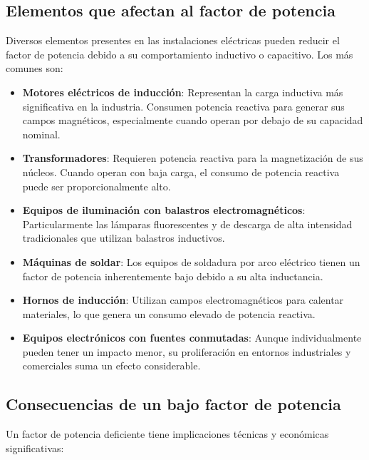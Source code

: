 \documentclass{report}          %
\begin{document}
            \subsection{Elementos que afectan al factor de potencia}
                Diversos elementos presentes en las instalaciones eléctricas pueden reducir el factor de potencia debido a su comportamiento inductivo o capacitivo. Los más comunes son:
    
                \begin{itemize}
                    \item \textbf{Motores eléctricos de inducción}: Representan la carga inductiva más significativa en la industria. Consumen potencia reactiva para generar sus campos magnéticos, especialmente cuando operan por debajo de su capacidad nominal.
                    
                    \item \textbf{Transformadores}: Requieren potencia reactiva para la magnetización de sus núcleos. Cuando operan con baja carga, el consumo de potencia reactiva puede ser proporcionalmente alto.
                    
                    \item \textbf{Equipos de iluminación con balastros electromagnéticos}: Particularmente las lámparas fluorescentes y de descarga de alta intensidad tradicionales que utilizan balastros inductivos.
                    
                    \item \textbf{Máquinas de soldar}: Los equipos de soldadura por arco eléctrico tienen un factor de potencia inherentemente bajo debido a su alta inductancia.
                    
                    \item \textbf{Hornos de inducción}: Utilizan campos electromagnéticos para calentar materiales, lo que genera un consumo elevado de potencia reactiva.
                    
                    \item \textbf{Equipos electrónicos con fuentes conmutadas}: Aunque individualmente pueden tener un impacto menor, su proliferación en entornos industriales y comerciales suma un efecto considerable.
                \end{itemize}

            \subsection{Consecuencias de un bajo factor de potencia}
                Un factor de potencia deficiente tiene implicaciones técnicas y económicas significativas:
    
\end{document}
